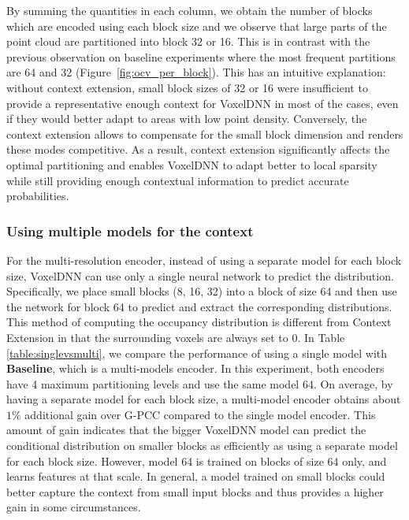 By summing the quantities in each column, we obtain the number of blocks which are encoded using each block size and we observe that large parts of the point cloud are partitioned into block 32 or 16. This is in contrast with the previous observation on baseline experiments where the most frequent partitions are 64 and 32 (Figure~\ref{fig:ocv_per_block}). This has an intuitive explanation: without context extension, small block sizes of 32 or 16 were insufficient to provide a representative enough context for VoxelDNN in most of the cases, even if they would better adapt to areas with low point density. Conversely, the context extension allows to compensate for the small block dimension and renders these modes competitive.
As a result, context extension significantly affects the optimal partitioning and enables VoxelDNN to adapt better to local sparsity while still providing enough contextual information to predict accurate probabilities.

\subsubsection{Using multiple models for the context} For the multi-resolution encoder, instead of using a separate model for each block size, VoxelDNN can use only a single neural network to predict the distribution. Specifically, we place small blocks (8, 16, 32) into a block of size 64 and then use the network for block 64 to predict and extract the corresponding distributions. This method of computing the occupancy distribution is different from Context Extension in that the surrounding voxels are always set to $0$. In Table \ref{table:singlevsmulti}, we compare the performance of using a single model with \textbf{Baseline}, which is a multi-models encoder. In this experiment, both encoders have 4 maximum partitioning levels and use the same model 64. On average, by having a separate model for each block size, a multi-model encoder obtains about $1\%$ additional gain over G-PCC compared to the single model encoder. This amount of gain indicates that the bigger VoxelDNN model can predict the conditional distribution on smaller blocks as efficiently as using a separate model for each block size. However, model 64 is trained on blocks of size 64 only, and learns features at that scale. In general, a model trained on small blocks could better capture the context from small input blocks and thus provides a higher gain in some circumstances.



